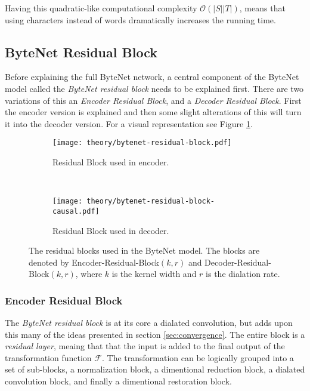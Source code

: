 Having this quadratic-like computational complexity $\mathcal{O}(|S||T|)$, means that using characters instead of words dramatically increases the running time.

\subsection{ByteNet Residual Block}

Before explaining the full ByteNet network, a central component of the ByteNet model called the \textit{ByteNet residual block} needs to be explained first. There are two variations of this an \textit{Encoder Residual Block}, and a \textit{Decoder Residual Block}. First the encoder version is explained and then some slight alterations of this will turn it into the decoder version. For a visual representation see Figure \ref{fig:bytenet:residual-block}.

\begin{figure}[h]
    \centering
    \begin{subfigure}[b]{0.45\textwidth}
        \centering
        \texttt{[image: theory/bytenet-residual-block.pdf]}
        \caption{Residual Block used in encoder.}
    \end{subfigure}
    ~ %
    \begin{subfigure}[b]{0.45\textwidth}
        \centering
        \texttt{[image: theory/bytenet-residual-block-causal.pdf]}
        \caption{Residual Block used in decoder.}
    \end{subfigure}
    \caption{The residual blocks used in the ByteNet model. The blocks are denoted by Encoder-Residual-Block$(k,r)$ and Decoder-Residual-Block$(k,r)$, where $k$ is the kernel width and $r$ is the dialation rate.}
    \label{fig:bytenet:residual-block}
\end{figure}

\subsubsection{Encoder Residual Block}

The \textit{ByteNet residual block} is at its core a dialated convolution, but adds upon this many of the ideas presented in section \ref{sec:convergence}. The entire block is a \textit{residual layer}, meaing that that the input is added to the final output of the transformation function $\mathcal{F}$. The transformation can be logically grouped into a set of sub-blocks, a normalization block, a dimentional reduction block, a dialated convolution block, and finally a dimentional restoration block.

